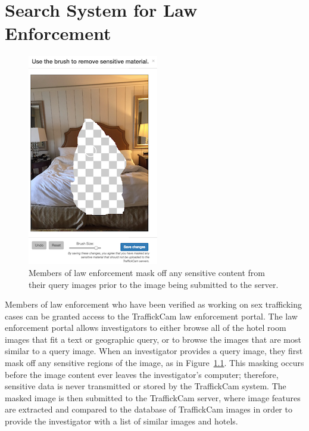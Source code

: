 
\chapter{Search System for Law Enforcement}
\label{ch:7}

\begin{figure}[Ht!]
  \begin{center}
    \includegraphics[width=.7\columnwidth]{figures/chapter6/masking.png}
 \end{center}
  \caption{Members of law enforcement mask off any sensitive content from their query images prior to the image being submitted to the server.}
  \label{fig:masking}
\end{figure}

Members of law enforcement who have been verified as working on sex trafficking cases can be granted access to the TraffickCam law enforcement portal. The law enforcement portal allows investigators to either browse all of the hotel room images that fit a text or geographic query, or to browse the images that are most similar to a query image. When an investigator provides a query image, they first mask off any sensitive regions of the image, as in Figure~\ref{fig:masking}. This masking occurs before the image content ever leaves the investigator's computer; therefore, sensitive data is never transmitted or stored by the TraffickCam system. The masked image is then submitted to the TraffickCam server, where image features are extracted and compared to the database of TraffickCam images in order to provide the investigator with a list of similar images and hotels.

